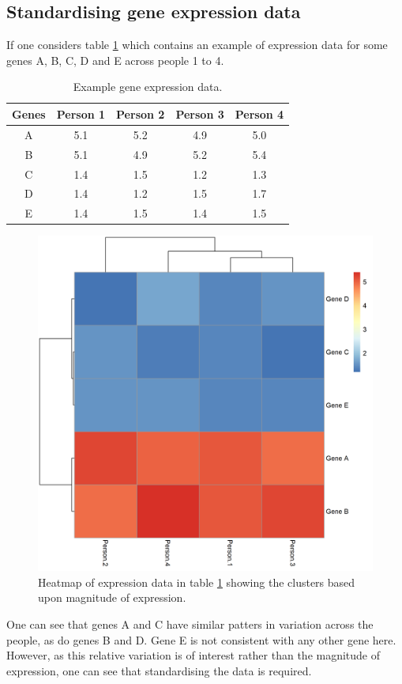 \documentclass[12pt]{article} %
\begin{document}
\subsection{Standardising gene expression data} \label{sec:motivating_example_standardisation}
If one considers table \ref{table:example_gene_expression_data} which contains an example of expression data for some genes A, B, C, D and E across people 1 to 4.
\begin{table}[!htb] 
	\centering
	\begin{tabular}{c|cccc} 
		Genes 	& Person 1	& Person 2	& Person 3	& Person 4	\\ 
		\hline
		A 		& 5.1		& 5.2 		& 4.9		& 5.0		\\
		B 		& 5.1		& 4.9		& 5.2		& 5.4		\\
		C 		& 1.4		& 1.5		& 1.2		& 1.3		\\
		D 		& 1.4		& 1.2		& 1.5		& 1.7		\\
		E 		& 1.4		& 1.5		& 1.4		& 1.5		
	\end{tabular}
	\caption{Example gene expression data.}
	\label{table:example_gene_expression_data}
\end{table}
\begin{figure}[!htb]
	\centering
	\includegraphics[scale=0.55]{Images/Examples/example_expression_data.png}
	\caption{Heatmap of expression data in table \ref{table:example_gene_expression_data} showing the clusters based upon magnitude of expression.}
	\label{fig:example_expression_data}
\end{figure}
One can see that genes A and C have similar patters in variation across the people, as do genes B and D. Gene E is not consistent with any other gene here. However, as this relative variation is of interest rather than the magnitude of expression, one can see that standardising the data is required. 
\end{document}
